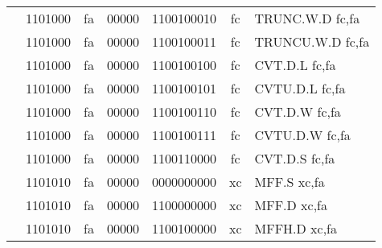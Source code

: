 \begin{table}[p]
\begin{small}
\begin{center}
\begin{tabular}{rcccccccccl}
&
\multicolumn{2}{|c|}{1101000} &
\multicolumn{1}{c|}{fa} &
\multicolumn{1}{c|}{00000} &
\multicolumn{4}{c|}{1100100010} &
\multicolumn{1}{c|}{fc} & TRUNC.W.D fc,fa \\
\cline{2-10}
  

&
\multicolumn{2}{|c|}{1101000} &
\multicolumn{1}{c|}{fa} &
\multicolumn{1}{c|}{00000} &
\multicolumn{4}{c|}{1100100011} &
\multicolumn{1}{c|}{fc} & TRUNCU.W.D fc,fa \\
\cline{2-10}
  

&
\multicolumn{2}{|c|}{1101000} &
\multicolumn{1}{c|}{fa} &
\multicolumn{1}{c|}{00000} &
\multicolumn{4}{c|}{1100100100} &
\multicolumn{1}{c|}{fc} & CVT.D.L fc,fa \\
\cline{2-10}
  

&
\multicolumn{2}{|c|}{1101000} &
\multicolumn{1}{c|}{fa} &
\multicolumn{1}{c|}{00000} &
\multicolumn{4}{c|}{1100100101} &
\multicolumn{1}{c|}{fc} & CVTU.D.L fc,fa \\
\cline{2-10}
  

&
\multicolumn{2}{|c|}{1101000} &
\multicolumn{1}{c|}{fa} &
\multicolumn{1}{c|}{00000} &
\multicolumn{4}{c|}{1100100110} &
\multicolumn{1}{c|}{fc} & CVT.D.W fc,fa \\
\cline{2-10}
  

&
\multicolumn{2}{|c|}{1101000} &
\multicolumn{1}{c|}{fa} &
\multicolumn{1}{c|}{00000} &
\multicolumn{4}{c|}{1100100111} &
\multicolumn{1}{c|}{fc} & CVTU.D.W fc,fa \\
\cline{2-10}
  

&
\multicolumn{2}{|c|}{1101000} &
\multicolumn{1}{c|}{fa} &
\multicolumn{1}{c|}{00000} &
\multicolumn{4}{c|}{1100110000} &
\multicolumn{1}{c|}{fc} & CVT.D.S fc,fa \\
\cline{2-10}
  

&
\multicolumn{2}{|c|}{1101010} &
\multicolumn{1}{c|}{fa} &
\multicolumn{1}{c|}{00000} &
\multicolumn{4}{c|}{0000000000} &
\multicolumn{1}{c|}{xc} & MFF.S xc,fa \\
\cline{2-10}
  

&
\multicolumn{2}{|c|}{1101010} &
\multicolumn{1}{c|}{fa} &
\multicolumn{1}{c|}{00000} &
\multicolumn{4}{c|}{1100000000} &
\multicolumn{1}{c|}{xc} & MFF.D xc,fa \\
\cline{2-10}
  

&
\multicolumn{2}{|c|}{1101010} &
\multicolumn{1}{c|}{fa} &
\multicolumn{1}{c|}{00000} &
\multicolumn{4}{c|}{1100100000} &
\multicolumn{1}{c|}{xc} & MFFH.D xc,fa \\
\cline{2-10}
  


\end{tabular}
\end{center}
\end{small}
\end{table}
